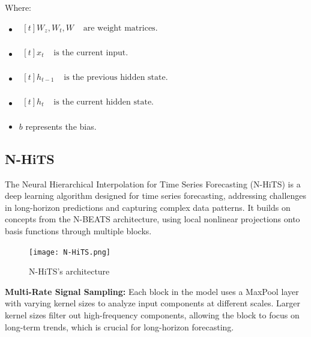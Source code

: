 \documentclass{ieeeojies}
\begin{document}
Where: 
\begin{itemize}
    \item $\begin{aligned}[t]
            W_z, W_t, W & \text{ are weight matrices.} \\
            \end{aligned}$
    \item $\begin{aligned}[t]
            x_t & \text{ is the current input.} \\
            \end{aligned}$
    \item $\begin{aligned}[t]
            h_{t-1} & \text{ is the previous hidden state.} \\
            \end{aligned}$
   \item $\begin{aligned}[t]
            h_t & \text{ is the current hidden state.} \\
            \end{aligned}$     
    \item $b$ represents the bias.
\end{itemize}

\subsection{N-HiTS}
The Neural Hierarchical Interpolation for Time Series Forecasting (N-HiTS) is a deep learning algorithm designed for time series forecasting, addressing challenges in long-horizon predictions and capturing complex data patterns. It builds on concepts from the N-BEATS architecture, using local nonlinear projections onto basis functions through multiple blocks.

\begin{figure}[H]
    \centering
    \begin{minipage}{0.50\textwidth}
    \centering
    \texttt{[image: N-HiTS.png]}
    \caption{N-HiTS’s architecture}
    \label{fig:1}
    \end{minipage}
\end{figure}

\textbf{Multi-Rate Signal Sampling:} Each block in the model uses a MaxPool layer with varying kernel sizes to analyze input components at different scales. Larger kernel sizes filter out high-frequency components, allowing the block to focus on long-term trends, which is crucial for long-horizon forecasting.
\end{document}
